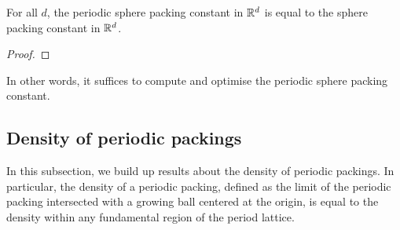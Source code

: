 \begin{theorem}\label{periodic-packing-optimal}\notready
    For all $d$, the periodic sphere packing constant in $\mathbb{R}^d$ is equal to the sphere packing constant in $\mathbb{R}^d$.
\end{theorem}
\begin{proof}
\end{proof}

In other words, it suffices to compute and optimise the periodic sphere packing constant.

\subsection{Density of periodic packings}

In this subsection, we build up results about the density of periodic packings. In particular, the density of a periodic packing, defined as the limit of the periodic packing intersected with a growing ball centered at the origin, is equal to the density within any fundamental region of the period lattice.

